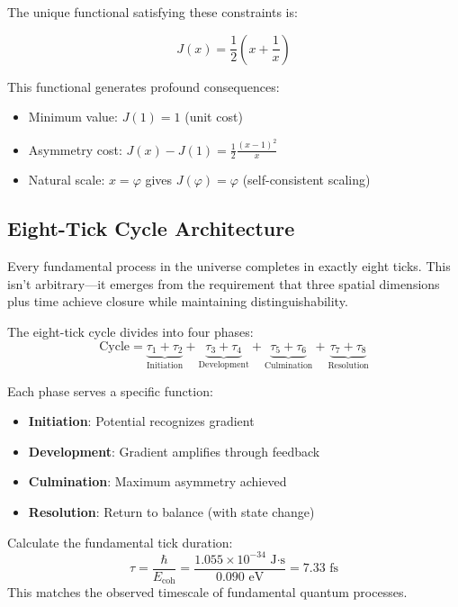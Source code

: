 \documentclass[12pt,a4paper]{article}
\newcommand{\Ecoh}{E_{\text{coh}}}
\newcommand{\tick}{\tau}
\newcommand{\golden}{\varphi}
\theoremstyle{definition}
\begin{document}
The unique functional satisfying these constraints is:

\begin{equation}
    J(x) = \frac{1}{2}\left(x + \frac{1}{x}\right)
\end{equation}

This functional generates profound consequences:

\begin{itemize}
    \item Minimum value: $J(1) = 1$ (unit cost)
    \item Asymmetry cost: $J(x) - J(1) = \frac{1}{2}\frac{(x-1)^2}{x}$
    \item Natural scale: $x = \golden$ gives $J(\golden) = \golden$ (self-consistent scaling)
\end{itemize}

\subsection{Eight-Tick Cycle Architecture}

Every fundamental process in the universe completes in exactly eight ticks. This isn't arbitrary—it emerges from the requirement that three spatial dimensions plus time achieve closure while maintaining distinguishability.

The eight-tick cycle divides into four phases:
\begin{equation}
    \text{Cycle} = \underbrace{\tick_1 + \tick_2}_{\text{Initiation}} + \underbrace{\tick_3 + \tick_4}_{\text{Development}} + \underbrace{\tick_5 + \tick_6}_{\text{Culmination}} + \underbrace{\tick_7 + \tick_8}_{\text{Resolution}}
\end{equation}

Each phase serves a specific function:
\begin{itemize}
    \item \textbf{Initiation}: Potential recognizes gradient
    \item \textbf{Development}: Gradient amplifies through feedback
    \item \textbf{Culmination}: Maximum asymmetry achieved
    \item \textbf{Resolution}: Return to balance (with state change)
\end{itemize}

\begin{verifybox}
Calculate the fundamental tick duration:
\begin{equation}
    \tick = \frac{\hbar}{\Ecoh} = \frac{1.055 \times 10^{-34} \text{ J·s}}{0.090 \text{ eV}} = 7.33 \text{ fs}
\end{equation}
This matches the observed timescale of fundamental quantum processes.
\end{verifybox}
\end{document}
